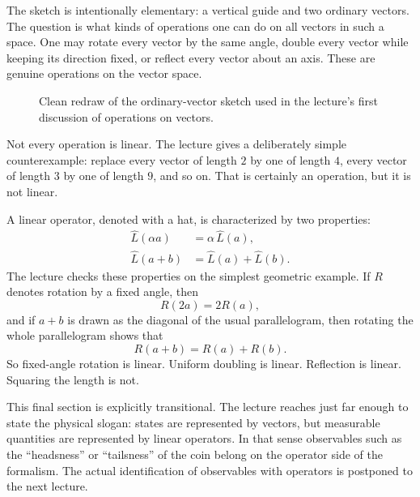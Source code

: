 The sketch is intentionally elementary: a vertical guide and two ordinary vectors. The question is what kinds of operations one can do on all vectors in such a space. One may rotate every vector by the same angle, double every vector while keeping its direction fixed, or reflect every vector about an axis. These are genuine operations on the vector space.

\begin{figure}[h]
\centering
{}
\caption{Clean redraw of the ordinary-vector sketch used in the lecture's first discussion of operations on vectors.}
\end{figure}

Not every operation is linear. The lecture gives a deliberately simple counterexample: replace every vector of length \(2\) by one of length \(4\), every vector of length \(3\) by one of length \(9\), and so on. That is certainly an operation, but it is not linear.

A linear operator, denoted with a hat, is characterized by two properties:
\begin{align}
\hat L(\alpha a) &= \alpha\,\hat L(a),\\
\hat L(a+b) &= \hat L(a) + \hat L(b).
\end{align}
The lecture checks these properties on the simplest geometric example. If \(R\) denotes rotation by a fixed angle, then
\begin{equation}
R(2a) = 2R(a),
\end{equation}
and if \(a+b\) is drawn as the diagonal of the usual parallelogram, then rotating the whole parallelogram shows that
\begin{equation}
R(a+b) = R(a) + R(b).
\end{equation}
So fixed-angle rotation is linear. Uniform doubling is linear. Reflection is linear. Squaring the length is not.

This final section is explicitly transitional. The lecture reaches just far enough to state the physical slogan: states are represented by vectors, but measurable quantities are represented by linear operators. In that sense observables such as the ``headsness'' or ``tailsness'' of the coin belong on the operator side of the formalism. The actual identification of observables with operators is postponed to the next lecture.


